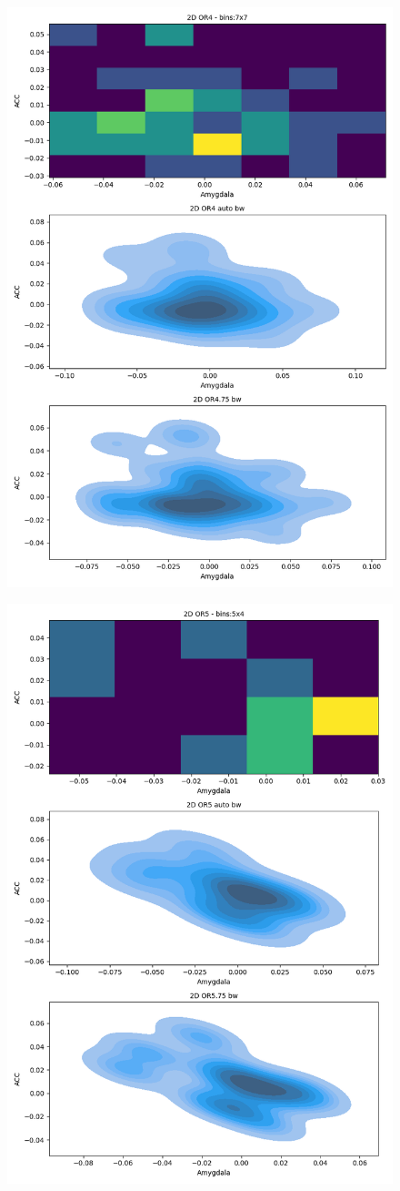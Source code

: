 \documentclass[twoside,12pt]{article}
\begin{document}
\begin{enumerate}[label*=\arabic*.]
\begin{figure}[H]
    \end{figure}
  \begin{figure}[H]
        \centering
        \includegraphics[width=\textwidth, height=\textwidth]{images/2D_2D OR4.png}
    \end{figure}
  \begin{figure}[H]
        \centering
        \includegraphics[width=\textwidth, height=\textwidth]{images/2D_2D OR5.png}
    \end{figure}
 

\end{enumerate}
\end{document}
